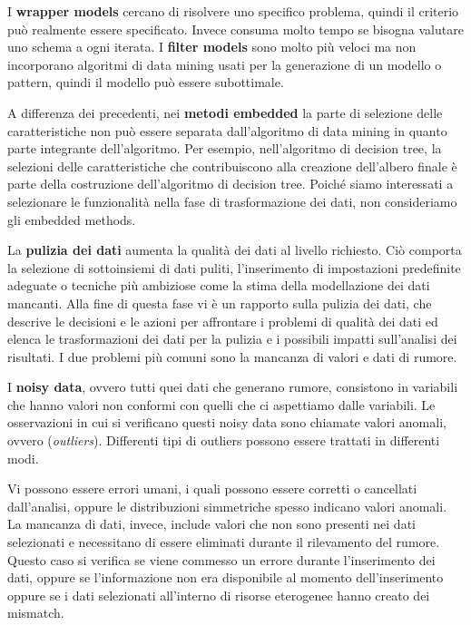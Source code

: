 \documentclass[a4paper]{extarticle}
\begin{document}
I \textbf{wrapper models} cercano di risolvere uno specifico problema, quindi il criterio può realmente essere specificato. Invece consuma molto tempo se bisogna valutare uno schema a ogni iterata. I \textbf{filter models} sono molto più veloci  ma non incorporano algoritmi di data mining usati per la generazione di un modello o pattern, quindi il modello può essere subottimale.

A differenza dei precedenti, nei \textbf{metodi embedded} la parte di selezione delle caratteristiche non può essere separata dall'algoritmo di data mining in quanto parte integrante dell'algoritmo. Per esempio, nell'algoritmo di decision tree, la selezioni delle caratteristiche che contribuiscono alla creazione dell'albero finale è parte della costruzione dell'algoritmo di decision tree. Poiché siamo interessati a selezionare le funzionalità nella fase di trasformazione dei dati, non consideriamo gli embedded methods.

La \textbf{pulizia dei dati} aumenta la qualità dei dati al livello richiesto. Ciò comporta la selezione di sottoinsiemi di dati puliti, l'inserimento di impostazioni predefinite adeguate o tecniche più ambiziose come la stima della modellazione dei dati mancanti. Alla fine di questa fase vi è un rapporto sulla pulizia dei dati, che descrive le decisioni e le azioni per affrontare i problemi di qualità dei dati ed elenca le trasformazioni dei dati per la pulizia e i possibili impatti sull'analisi dei risultati. I due problemi più comuni sono la mancanza di valori e dati di rumore. 

I \textbf{noisy data}, ovvero tutti quei dati che generano rumore, consistono in variabili che hanno valori non conformi con quelli che ci aspettiamo dalle variabili. Le osservazioni in cui si verificano questi noisy data sono chiamate valori anomali, ovvero (\textit{outliers}). Differenti tipi di outliers possono essere trattati in differenti modi. 

Vi possono essere errori umani, i quali possono essere corretti o cancellati dall'analisi, oppure le distribuzioni simmetriche spesso indicano valori anomali. La mancanza di dati, invece, include valori che non sono presenti nei dati selezionati e necessitano di essere eliminati durante il rilevamento del rumore. Questo caso si verifica se viene commesso un errore durante l'inserimento dei dati, oppure se l'informazione non era disponibile al momento dell'inserimento oppure se i dati selezionati all'interno di risorse eterogenee hanno creato dei mismatch. 
\end{document}
